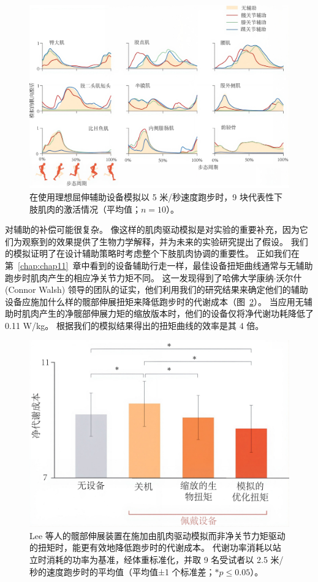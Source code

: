 \begin{figure}[!htb]
	\centering
	\includegraphics[width=1.0\linewidth]{chap12/12_13}
	\caption{在使用理想屈伸辅助设备模拟以 5 米/秒速度跑步时，9 块代表性下肢肌肉的激活情况（平均值；$n = 10$）\cite{uchida2016simulating}。 \label{fig:12_13}}
\end{figure}


对辅助的补偿可能很复杂。
像这样的肌肉驱动模拟是对实验的重要补充，因为它们为观察到的效果提供了生物力学解释，并为未来的实验研究提出了假设。
我们的模拟证明了在设计辅助策略时考虑整个下肢肌肉协调的重要性。
正如我们在第~\ref{chap:chap11}~章中看到的设备辅助行走一样，最佳设备扭矩曲线通常与无辅助跑步时肌肉产生的相应净关节力矩不同。
这一发现得到了哈佛大学康纳$\cdot$沃尔什 (Connor Walsh) 领导的团队的证实，他们利用我们的研究结果来确定他们的辅助设备应施加什么样的髋部伸展扭矩来降低跑步时的代谢成本（图~\ref{fig:12_14}）。
当应用无辅助时肌肉产生的净髋部伸展力矩的缩放版本时，他们的设备仅将净代谢功耗降低了 0.11 W/kg。
根据我们的模拟结果得出的扭矩曲线的效率是其 4 倍。


\begin{figure}[!htb]
	\centering
	\includegraphics[width=0.65\linewidth]{chap12/12_14}
	\caption{Lee 等人的髋部伸展装置在施加由肌肉驱动模拟而非净关节力矩驱动的扭矩时，能更有效地降低跑步时的代谢成本。
		代谢功率消耗以站立时消耗的功率为基准，经体重标准化，并取 9 名受试者以 2.5 米/秒的速度跑步时的平均值（平均值±1 个标准差；$*p \leq 0.05$）\cite{lee2017reducing}。 \label{fig:12_14}}
\end{figure}


